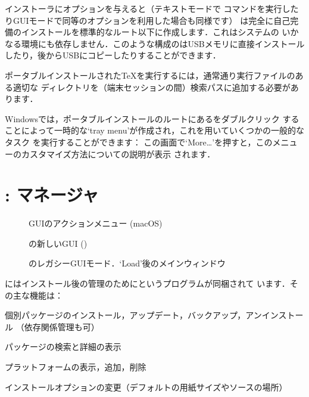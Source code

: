 \documentclass[uplatex,dvipdfmx,tombow]{jsarticle}
\begin{document}
\TL インストーラにオプションを与えると（テキストモードで%
コマンドを実行したりGUIモードで同等のオプションを利用した場合も同様です）\TL
は完全に自己完備のインストールを標準的なルート以下に作成します．これはシステムの
いかなる環境にも依存しません．このような構成の\TL はUSBメモリに直接インストール
したり，後からUSBにコピーしたりすることができます．

ポータブルインストールされた\TeX を実行するには，通常通り実行ファイルのある適切な
ディレクトリを（端末セッションの間）検索パスに追加する必要があります．

Windowsでは，ポータブルインストールのルートにあるをダブルクリック
することによって一時的な`tray menu'が作成され，これを用いていくつかの一般的なタスク
を実行することができます：
%
\medskip
{}
\smallskip
%
この画面で`More\ldots'を押すと，このメニューのカスタマイズ方法についての説明が表示
されます．

\section{: \TL マネージャ}
\label{sec:tlmgr}

\begin{figure}[tb]
\caption{ GUIのアクションメニュー (macOS)}
\label{fig:tlshell}
\end{figure}

\begin{figure}[tb]
\caption{の新しい{GUI} ()}
\label{fig:tlcockpit}
\end{figure}

\begin{figure}[tb]
\caption{のレガシーGUIモード．`Load'後のメインウィンドウ}
\label{fig:tlmgr-gui}
\end{figure}

\TL にはインストール後の\TL 管理のためにというプログラムが同梱されて
います．その主な機能は：
%
\begin{itemize*}
\item 個別パッケージのインストール，アップデート，バックアップ，アンインストール
  （依存関係管理も可）
\item パッケージの検索と詳細の表示
\item プラットフォームの表示，追加，削除
\item インストールオプションの変更（デフォルトの用紙サイズやソースの場所）
\end{itemize*}
\end{document}
